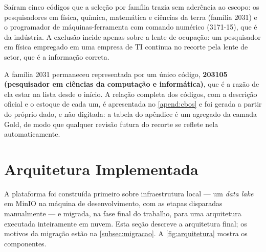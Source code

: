 Saíram cinco códigos que a seleção por família trazia sem aderência ao escopo: os pesquisadores em física, química, matemática e ciências da terra (família 2031) e o programador de máquinas-ferramenta com comando numérico (3171-15), que é da indústria. A exclusão incide apenas sobre a lente de ocupação: um pesquisador em física empregado em uma empresa de TI continua no recorte pela lente de setor, que é a informação correta.

A família 2031 permaneceu representada por um único código, \textbf{203105 (pesquisador em ciências da computação e informática)}, que é a razão de ela estar na lista desde o início. A relação completa dos códigos, com a descrição oficial e o estoque de cada um, é apresentada no \autoref{apend:cbos} e foi gerada a partir do próprio dado, e não digitada: a tabela do apêndice é um agregado da camada Gold, de modo que qualquer revisão futura do recorte se reflete nela automaticamente.

\section{Arquitetura Implementada}
\label{sec:arquitetura}

A plataforma foi construída primeiro sobre infraestrutura local --- um \textit{data lake} em MinIO na máquina de desenvolvimento, com as etapas disparadas manualmente --- e migrada, na fase final do trabalho, para uma arquitetura executada inteiramente em nuvem. Esta seção descreve a arquitetura final; os motivos da migração estão na \autoref{subsec:migracao}. A \autoref{fig:arquitetura} mostra os componentes.

